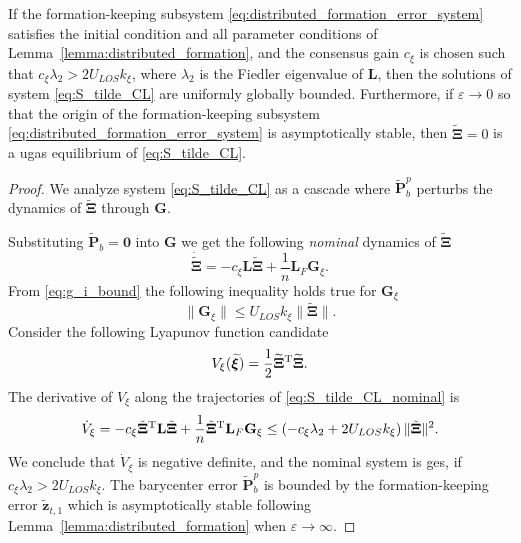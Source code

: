 \begin{lemma}
    If the formation-keeping subsystem \eqref{eq:distributed_formation_error_system} satisfies the initial condition and all parameter conditions of Lemma~\ref{lemma:distributed_formation}, and the consensus gain $c_\xi$ is chosen such that $c_\xi \lambda_2 > 2 U_{LOS} k_\xi$, where $\lambda_2$ is the Fiedler eigenvalue of $\mathbf{L}$, then the solutions of system \eqref{eq:S_tilde_CL} are uniformly globally bounded. Furthermore, if $\varepsilon \rightarrow 0$ so that the origin of the formation-keeping subsystem \eqref{eq:distributed_formation_error_system} is asymptotically stable, then $\widetilde{\bm{\Xi}}=0$ is a \gls{ugas} equilibrium of \eqref{eq:S_tilde_CL}.
\end{lemma}

\begin{proof}
    We analyze system \eqref{eq:S_tilde_CL} as a cascade where $\widetilde{\mathbf{P}}_b^p$ perturbs the dynamics of $\widetilde{\bm{\Xi}}$ through $\mathbf{G}$.

    Substituting $\widetilde{\mathbf{P}}_b = \mathbf{0}$ into $\mathbf{G}$ we get the following \textit{nominal} dynamics of $\widetilde{\bm{\Xi}}$
    \begin{equation}
    \dot{\widetilde{\bm{\Xi}}} = -c_\xi \mathbf{L} \widetilde{\bm{\Xi}} + \frac{1}{n} \mathbf{L}_{F} \mathbf{G}_\xi.
\label{eq:S_tilde_CL_nominal}
\end{equation}
From \eqref{eq:g_i_bound} the following inequality holds true for $\mathbf{G}_\xi$
\begin{equation}
    \|\mathbf{G}_\xi\| \leq U_{LOS} k_\xi \|\widetilde{\bm{\Xi}}\|.
\end{equation}
Consider the following Lyapunov function candidate
\begin{equation}
    V_\xi(\widetilde{\bm{\xi}}) = \frac{1}{2}\widetilde{\bm{\Xi}}^{\rm T}\widetilde{\bm{\Xi}}.
\end{equation}
The derivative of $V_\xi$ along the trajectories of \eqref{eq:S_tilde_CL_nominal} is
\begin{equation}
     \dot{V}_{\xi} = - c_\xi \Tilde{\bm{\Xi}}^{\rm T} \mathbf{L} \Tilde{\bm{\Xi}} + \frac{1}{n} \Tilde{\bm{\Xi}}^{\rm T} \mathbf{L}_{F} \mathbf{G}_\xi
            \leq  \left( -c_\xi \lambda_{2} + 2 U_{LOS} k_\xi \right) \|\Tilde{\bm{\Xi}}\|^2.
\end{equation}
We conclude that $\dot{V}_\xi$ is negative definite, and the nominal system is \gls{ges}, if $c_\xi \lambda_2 > 2U_{LOS} k_\xi$. The barycenter error $\widetilde{\mathbf{P}}_b^p$ is bounded by the formation-keeping error $\tilde{\mathbf{z}}_{t,1}$ which is asymptotically stable following Lemma~\ref{lemma:distributed_formation} when $\varepsilon \rightarrow \infty$.


\end{proof}
